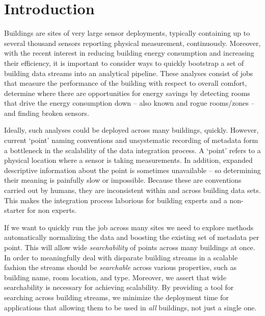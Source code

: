 \section{Introduction}

Buildings are sites of very large sensor deployments, typically containing
up to several thousand sensors reporting physical measurement, continuously.
Moreover, with the recent interest in reducing building energy consumption and
increasing their efficiency, it
is important to consider ways to quickly bootstrap a set of building data streams
into an analytical pipeline.  These analyses consist of jobs that measure the performance
of the building with respect to overall comfort, determine where there are 
opportunities for energy savings by detecting rooms that drive the energy consumption down --
also known and rogue rooms/zones -- and finding broken sensors. 

Ideally, such analyses could be deployed across many buildings, quickly. 
However, current `point' naming conventions and unsystematic recording of metadata form a 
bottleneck in the scalability of the data integration process.  A `point' refers to a 
physical location where a sensor is taking measurements. 
In addition, expanded descriptive information about the point is sometimes unavailable 
-- so determining their meaning is painfully slow or impossible.  
Because these are conventions carried
out by humans, they are inconsistent within and across building data sets.
This makes the integration process laborious for building experts and a non-starter for 
non experts.  %

If we want to quickly run the job across many sites we need
to explore methods automatically normalizing the data and boosting the
existing set of metadata per point.  This will allow wide \emph{searchability} of points across
many buildings at once.
In order to meaningfully deal with disparate building streams in a scalable 
fashion the streams should be \emph{searchable} across various properties, such
as building name, room location, and type.  Moreover, we
assert that wide searchability is necessary for achieving scalability.  By providing a tool for
searching across building streams, we minimize the deployment time for applications that 
allowing them to be used in \emph{all} buildings, not just a single one.  

